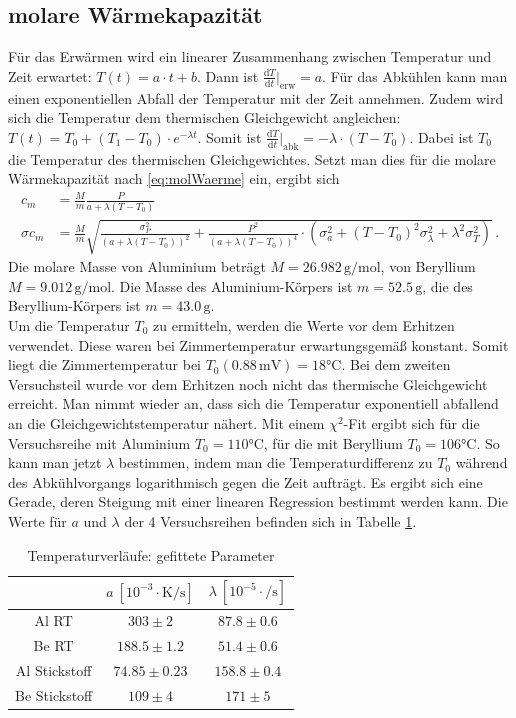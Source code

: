\documentclass[12pt,a4paper,titlepage,headinclude,bibtotoc]{scrartcl}
\newcommand{\dif}{\ensuremath{\mathrm{d}}}
\begin{document}
\subsection{molare Wärmekapazität}
Für das Erwärmen wird ein linearer Zusammenhang zwischen Temperatur und Zeit erwartet: $T(t)=a\cdot t +b$.
Dann ist $\frac{\dif T}{\dif t}|_\text{erw}=a$.
Für das Abkühlen kann man einen exponentiellen Abfall der Temperatur mit der Zeit annehmen.
Zudem wird sich die Temperatur dem thermischen Gleichgewicht angleichen: $T(t)=T_0+(T_1-T_0)\cdot e^{-\lambda t}$.
Somit ist $\frac{\dif T}{\dif t}|_\text{abk}=-\lambda\cdot (T-T_0)$.
Dabei ist $T_0$ die Temperatur des thermischen Gleichgewichtes.
Setzt man dies für die molare Wärmekapazität nach \eqref{eq:molWaerme} ein, ergibt sich
\begin{align}
	c_m&=\frac{M}{m}\frac{P}{a+\lambda (T-T_0)}
	\label{eq:c_m}\\
	\sigma{c_m}&=\frac{M}{m}\sqrt{\frac{\sigma_P^2}{(a+\lambda (T-T_0))^2}+\frac{P^2}{(a+\lambda (T-T_0))^4}\cdot (\sigma_a^2+(T-T_0)^2 \sigma_\lambda^2+\lambda^2\sigma_T^2)}\,.
	\label{eq:sigma_c_m}
\end{align}
Die molare Masse von Aluminium beträgt $M=26.982\,\si{\gram\per\mol}$, von Beryllium $M=9.012\,\si{\gram\per\mol}$.
Die Masse des Aluminium-Körpers ist $m=52.5\,\si\gram$, die des Beryllium-Körpers ist $m=43.0\,\si\gram$.\\
Um die Temperatur $T_0$ zu ermitteln, werden die Werte vor dem Erhitzen verwendet.
Diese waren bei Zimmertemperatur erwartungsgemäß konstant.
Somit liegt die Zimmertemperatur bei $T_0(0.88\,\text{mV})=18\si{\celsius}$.
Bei dem zweiten Versuchsteil wurde vor dem Erhitzen noch nicht das thermische Gleichgewicht erreicht.
Man nimmt wieder an, dass sich die Temperatur exponentiell abfallend an die Gleichgewichtstemperatur nähert.
Mit einem $\chi^2$-Fit ergibt sich für die Versuchsreihe mit Aluminium $T_0=110\si\celsius$, für die mit Beryllium $T_0=106\si\celsius$.
So kann man jetzt $\lambda$ bestimmen, indem man die Temperaturdifferenz zu $T_0$ während des Abkühlvorgangs logarithmisch gegen die Zeit aufträgt.
Es ergibt sich eine Gerade, deren Steigung mit einer linearen Regression bestimmt werden kann.
Die Werte für $a$ und $\lambda$ der 4 Versuchsreihen befinden sich in Tabelle \ref{tab:fitwerte}.
\begin{table}[!htb]
	\centering
	\begin{tabular}{|c|c|c|}
		\hline
		& $a~[10^{-3} \cdot \si{\kelvin\per\second}]$ & $\lambda~[10^{-5} \cdot \si{\per\second}]$\\
		\hline
		Al RT	& $	303	\pm	2	$ & $	87.8	\pm	0.6	$ \\
		Be RT	& $	188.5	\pm	1.2	$ & $	51.4	\pm	0.6	$ \\
		Al Stickstoff	& $	74.85	\pm	0.23	$ & $	158.8 \pm 0.4	$ \\
		Be Stickstoff	& $	109	\pm	4	$ & $	171 \pm 5$ \\
		\hline
	\end{tabular}
	\caption{Temperaturverläufe: gefittete Parameter}
	\label{tab:fitwerte}
\end{table}
\end{document}
